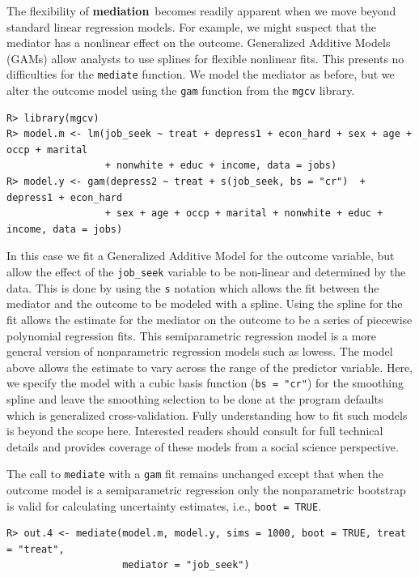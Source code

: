 \documentclass[11pt,letterpaper]{article}
\theoremstyle{plain}
\newcommand\bmediation{{\bf mediation}}
\begin{document}
The flexibility of \bmediation\ becomes readily apparent when we move
beyond standard linear regression models.  For example, we might
suspect that the mediator has a nonlinear effect on the outcome.
Generalized Additive Models (GAMs) allow analysts to use splines for
flexible nonlinear fits.  This presents no difficulties for the
\texttt{mediate} function.  We model the mediator as before, but we
alter the outcome model using the \texttt{gam} function from the
\texttt{mgcv} library.
\begin{verbatim}
R> library(mgcv)
R> model.m <- lm(job_seek ~ treat + depress1 + econ_hard + sex + age + occp + marital
                 + nonwhite + educ + income, data = jobs)
R> model.y <- gam(depress2 ~ treat + s(job_seek, bs = "cr")  + depress1 + econ_hard
                 + sex + age + occp + marital + nonwhite + educ + income, data = jobs)
\end{verbatim}
In this case we fit a Generalized Additive Model for the outcome
variable, but allow the effect of the \texttt{job\_seek} variable to
be non-linear and determined by the data. This is done by using the
\texttt{s} notation which allows the fit between the mediator and
the outcome to be modeled with a spline.  Using the spline for the fit
allows the estimate for the mediator on the outcome to be a series of
piecewise polynomial regression fits. This semiparametric regression
model is a more general version of nonparametric regression models
such as lowess. The model above allows the estimate to vary across the
range of the predictor variable. Here, we specify the model with a
cubic basis function (\texttt{bs = "cr"}) for the smoothing spline and
leave the smoothing selection to be done at the program defaults which
is generalized cross-validation.  Fully understanding how to fit such
models is beyond the scope here.  Interested readers should consult
\cite{Wood:2006} for full technical details and \cite{Keele:2008}
provides coverage of these models from a social science perspective.

The call to \texttt{mediate} with a \texttt{gam} fit remains
unchanged except that when the outcome model is a semiparametric
regression only the nonparametric bootstrap is valid for calculating
uncertainty estimates, i.e., {\tt boot = TRUE}.
\begin{verbatim}
R> out.4 <- mediate(model.m, model.y, sims = 1000, boot = TRUE, treat = "treat",
                    mediator = "job_seek")
\end{verbatim}
\end{document}
